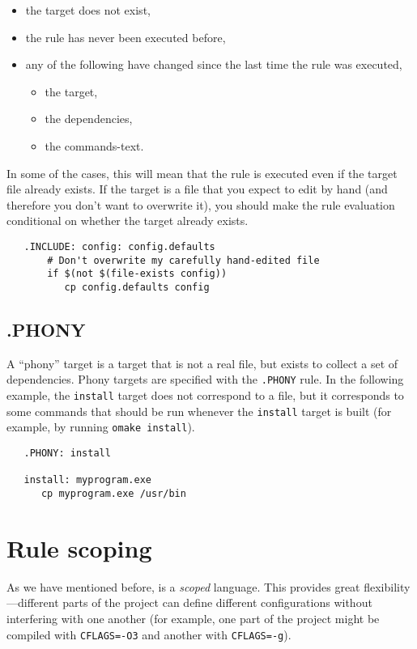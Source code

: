 \begin{itemize}
\item the target does not exist,
\item the rule has never been executed before,
\item any of the following have changed since the last time the rule was executed,
\begin{itemize}
\item the target,
\item the dependencies,
\item the commands-text.
\end{itemize}
\end{itemize}

In some of the cases, this will mean that the rule is executed even if the target file already
exists.  If the target is a file that you expect to edit by hand (and therefore you don't want to
overwrite it), you should make the rule evaluation conditional on whether the target already exists.

\begin{verbatim}
   .INCLUDE: config: config.defaults
       # Don't overwrite my carefully hand-edited file
       if $(not $(file-exists config))
          cp config.defaults config
\end{verbatim}

\subsection{.PHONY}
\label{target:.PHONY}

A ``phony'' target is a target that is not a real file, but exists to collect a set of dependencies.
Phony targets are specified with the \verb+.PHONY+ rule.  In the following example, the
\verb+install+ target does not correspond to a file, but it corresponds to some commands that should
be run whenever the \verb+install+ target is built (for example, by running \verb+omake install+).

\begin{verbatim}
   .PHONY: install

   install: myprogram.exe
      cp myprogram.exe /usr/bin
\end{verbatim}

\section{Rule scoping}

As we have mentioned before,  is a \emph{scoped} language.  This provides great
flexibility---different parts of the project can define different configurations without interfering
with one another (for example, one part of the project might be compiled with \verb+CFLAGS=-O3+ and
another with \verb+CFLAGS=-g+).

